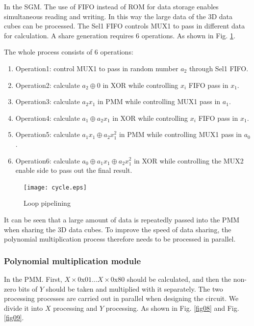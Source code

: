 In the SGM. The use of FIFO instead of ROM for data storage enables simultaneous reading and writing. In this way the large data of the 3D data cubes can be processed. The Sel1 FIFO controls MUX1 to pass in different data for calculation. A share generation requires 6 operations. As shown in Fig. \ref{fig07}.

The whole process consists of 6 operations:

\begin{enumerate}[(1)]
	\item Operation1: control MUX1 to pass in random number $a_2$ through Sel1 FIFO.
	\item Operation2: calculate $a_{2} \oplus 0$ in XOR while controlling $x_{i}$ FIFO pass in $x_{1}$.
	\item Operation3: calculate $a_{2}x_{1} $ in PMM while controlling MUX1 pass in $a_{1}$.
	\item Operation4: calculate $a_{1}\oplus a_{2} x_{1}$ in XOR while controlling $x_{i}$ FIFO pass in $x_{1}$.
	\item Operation5: calculate $a_{1}x_{1}  \oplus a_{2} x_{1}^{2}$ in PMM while controlling MUX1 pass in $a_{0}$.
	\item Operation6: calculate $a_{0}\oplus a_{1}x_{1}  \oplus a_{2} x_{1}^{2}$ in XOR while controlling the MUX2 enable side to pass out the final result.
\end{enumerate}

\begin{figure}
	\begin{center}
		\texttt{[image: cycle.eps]}
		\caption{Loop pipelining}
		\label{fig07}       %
		\vspace{-2.0em}
	\end{center}
\end{figure}
It can be seen that a large amount of data is repeatedly passed into the PMM when sharing the 3D data cubes. To improve the speed of data sharing, the polynomial multiplication process therefore needs to be processed in parallel.

\subsubsection{Polynomial multiplication module}\label{subsec_NC-BPDVC_framework}

In the PMM. First, $X\times 0\mathrm{x} 01 \ldots X\times0\mathrm{x} 80$ should be calculated, and then the non-zero bits of $Y$ should be taken and multiplied with it separately. The two processing processes are carried out in parallel when designing the circuit. We divide it into $X$ processing and $Y$ processing. As shown in Fig. \ref{fig08} and Fig. \ref{fig09}.

